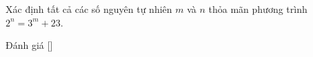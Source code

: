\ifshowproblem
\begin{problem}\label{problem:FRA-2015-TST3-P3}
    Xác định tất cả các số nguyên tự nhiên $m$ và $n$ thỏa mãn phương trình $2^n = 3^m + 23$.
\end{problem}
\fi

\ifshowinfo
Đánh giá [\textbf{}]
\fi